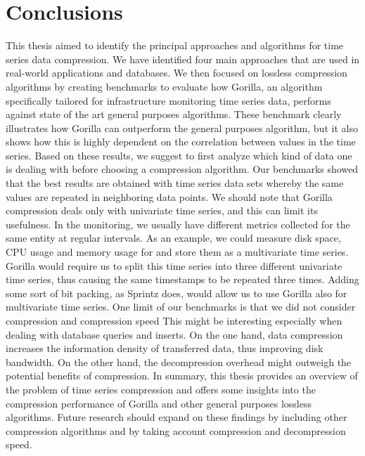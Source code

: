 \chapter*{Conclusions}
This thesis aimed to identify the principal approaches and algorithms for time series data compression.
We have identified four main approaches that are used in real-world applications and databases.
We then focused on lossless compression algorithms by creating benchmarks to evaluate how Gorilla,
an algorithm specifically tailored for infrastructure monitoring time series data, performs against
state of the art general purposes algorithms. 
These benchmark clearly illustrates how Gorilla can outperform the general purposes algorithm, but it
also shows how this is highly dependent on the correlation between values in the time series.
Based on these results, we suggest to first analyze which kind of data one is dealing with before choosing
a compression algorithm. Our benchmarks showed that the best results are obtained with time series data sets whereby the same values are repeated
in neighboring data points.
We should note that Gorilla compression deals only with univariate time series, and this can limit
its usefulness. In the monitoring, we usually have different metrics collected for the
same entity at regular intervals. As an example, we could measure disk space, CPU usage and memory usage
for and store them as a multivariate time series. Gorilla would require us to split this time series into
three different univariate time series, thus causing the same timestamps to be repeated three times.
Adding some sort of bit packing, as Sprintz does, would allow us to use Gorilla also for multivariate time series.
One limit of our benchmarks is that we did not consider compression and compression speed
This might be interesting especially when dealing with database queries and inserts. On the one hand,
data compression increases the information density of transferred data, thus
improving disk bandwidth. On the other hand, the decompression overhead might outweigh the potential
benefits of compression.
In summary, this thesis provides an overview of the problem of time series compression and offers some insights
into the compression performance of Gorilla and other general purposes lossless algorithms. Future research should expand
on these findings by including other compression algorithms and by taking account compression and
decompression speed.


